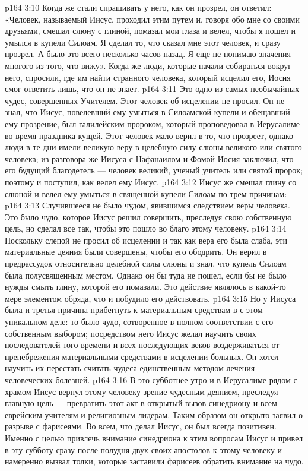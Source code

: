 \vs p164 3:10 Когда же стали спрашивать у него, как он прозрел, он ответил: «Человек, называемый Иисус, проходил этим путем и, говоря обо мне со своими друзьями, смешал слюну с глиной, помазал мои глаза и велел, чтобы я пошел и умылся в купели Силоам. Я сделал то, что сказал мне этот человек, и сразу прозрел. А было это всего несколько часов назад. Я еще не понимаю значения многого из того, что вижу». Когда же люди, которые начали собираться вокруг него, спросили, где им найти странного человека, который исцелил его, Иосия смог ответить лишь, что он не знает.
\vs p164 3:11 \pc Это одно из самых необычайных чудес, совершенных Учителем. Этот человек об исцелении не просил. Он не знал, что Иисус, повелевший ему умыться в Силоамской купели и обещавший ему прозрение, был галилейским пророком, который проповедовал в Иерусалиме во время праздника кущей. Этот человек мало верил в то, что прозреет, однако люди в те дни имели великую веру в целебную силу слюны великого или святого человека; из разговора же Иисуса с Нафанаилом и Фомой Иосия заключил, что его будущий благодетель --- человек великий, ученый учитель или святой пророк; поэтому и поступил, как велел ему Иисус.
\vs p164 3:12 Иисус же смешал глину со слюной и велел ему умыться в священной купели Силоам по трем причинам:
\vs p164 3:13 \bibnobreakspace Случившееся не было чудом, явившимся следствием веры человека. Это было чудо, которое Иисус решил совершить, преследуя свою собственную цель, но сделал все так, чтобы это пошло во благо этому человеку.
\vs p164 3:14 \bibnobreakspace Поскольку слепой не просил об исцелении и так как вера его была слаба, эти материальные деяния были совершены, чтобы его ободрить. Он верил в предрассудок относительно целебной силы слюны и знал, что купель Силоам была полусвященным местом. Однако он бы туда не пошел, если бы не было нужды смыть глину, которой его помазали. Это действие являлось в какой\hyp{}то мере элементом обряда, что и побудило его действовать.
\vs p164 3:15 \bibnobreakspace Но у Иисуса была и третья причина прибегнуть к материальным средствам в с этом уникальном деле: то было чудо, сотворенное в полном соответствии с его собственным выбором; посредством него Иисус желал научить своих последователей того времени и всех последующих веков воздерживаться от пренебрежения материальными средствами в исцелении больных. Он хотел научить их перестать считать чудеса единственным методом лечения человеческих болезней.
\vs p164 3:16 \pc В это субботнее утро и в Иерусалиме рядом с храмом Иисус вернул этому человеку зрение чудесным деянием, преследуя главную цель --- превратить этот акт в открытый вызов синедриону и всем еврейским учителям и религиозным лидерам. Таким образом он открыто заявил о разрыве с фарисеями. Во всем, что делал Иисус, он был всегда позитивен. Именно с целью привлечь внимание синедриона к этим вопросам Иисус и привел в эту субботу сразу после полудня двух своих апостолов к этому человеку и намеренно вызвал толки, которые заставили фарисеев обратить внимание на чудо.
